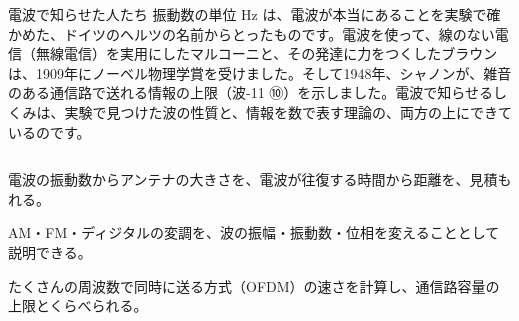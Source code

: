\begin{column}{電波で知らせた人たち}
振動数の単位 Hz は、電波が本当にあることを実験で確かめた、ドイツのヘルツの名前からとったものです。電波を使って、線のない電信（無線電信）を実用にしたマルコーニと、その発達に力をつくしたブラウンは、1909年にノーベル物理学賞を受けました。そして1948年、シャノンが、雑音のある通信路で送れる情報の上限（波-11 ⑩）を示しました。電波で知らせるしくみは、実験で見つけた波の性質と、情報を数で表す理論の、両方の上にできているのです。
\end{column}

\begin{furikaeri}
\begin{checklist}
\item 電波の振動数からアンテナの大きさを、電波が往復する時間から距離を、見積もれる。
\item AM・FM・ディジタルの変調を、波の振幅・振動数・位相を変えることとして説明できる。
\item たくさんの周波数で同時に送る方式（OFDM）の速さを計算し、通信路容量の上限とくらべられる。
\end{checklist}
\end{furikaeri}
